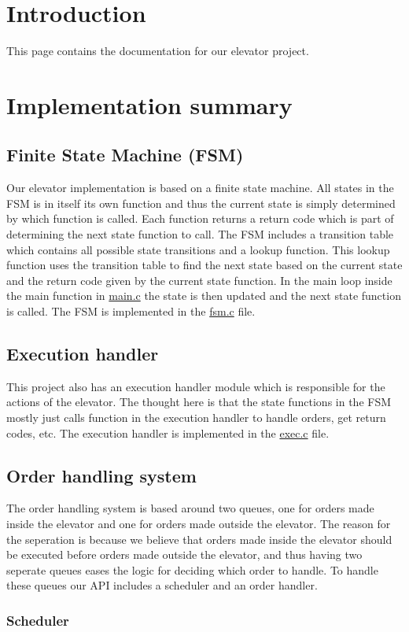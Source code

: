 \hypertarget{index_intro_sec}{}\section{Introduction}\label{index_intro_sec}
This page contains the documentation for our elevator project.\hypertarget{index_summary}{}\section{Implementation summary}\label{index_summary}
\hypertarget{index_fsm}{}\subsection{Finite State Machine (\+F\+S\+M)}\label{index_fsm}
Our elevator implementation is based on a finite state machine. All states in the F\+SM is in itself its own function and thus the current state is simply determined by which function is called. Each function returns a return code which is part of determining the next state function to call. The F\+SM includes a transition table which contains all possible state transitions and a lookup function. This lookup function uses the transition table to find the next state based on the current state and the return code given by the current state function. In the main loop inside the main function in \hyperlink{main_8c_source}{main.\+c} the state is then updated and the next state function is called. The F\+SM is implemented in the \hyperlink{fsm_8c_source}{fsm.\+c} file.\hypertarget{index_exec}{}\subsection{Execution handler}\label{index_exec}
This project also has an execution handler module which is responsible for the actions of the elevator. The thought here is that the state functions in the F\+SM mostly just calls function in the execution handler to handle orders, get return codes, etc. The execution handler is implemented in the \hyperlink{exec_8c_source}{exec.\+c} file.\hypertarget{index_order_and_scheduler}{}\subsection{Order handling system}\label{index_order_and_scheduler}
The order handling system is based around two queues, one for orders made inside the elevator and one for orders made outside the elevator. The reason for the seperation is because we believe that orders made inside the elevator should be executed before orders made outside the elevator, and thus having two seperate queues eases the logic for deciding which order to handle. To handle these queues our A\+PI includes a scheduler and an order handler.\hypertarget{index_scheduler}{}\subsubsection{Scheduler}\label{index_scheduler}
